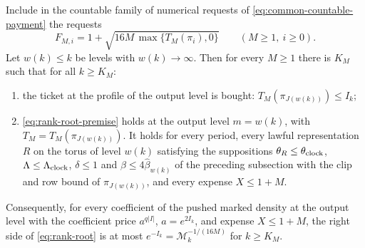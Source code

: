 \begin{proposition}
\label{prop:rank-root-output-ticket}
Include in the countable family of numerical requests of
\eqref{eq:common-countable-payment} the requests
\begin{equation}\label{eq:rank-root-ticket-requests}
 F_{M,i}=1+\sqrt{16M\,\max\{T_M(\pi_i),0\}}\qquad(M\ge1,\ i\ge0).
\end{equation}
Let $w(k)\le k$ be levels with $w(k)\to\infty$. Then for every
$M\ge1$ there is $K_M$ such that for all $k\ge K_M$:
\begin{enumerate}
\item the ticket at the profile of the output level is bought:
 $T_M(\pi_{J(w(k))})\le I_k$;
\item \eqref{eq:rank-root-premise} holds at the output level $m=w(k)$,
 with $T_M=T_M(\pi_{J(w(k))})$. It holds for every period, every
 lawful representation $R$ on the torus of level $w(k)$ satisfying the
 suppositions $\theta_R\le\theta_{\rm clock}$, $\Lambda\le\Lambda_{\rm clock}$,
 $\delta\le1$ and $\beta\le4\widehat\beta_{w(k)}$ of the preceding
 subsection with the clip and row bound of $\pi_{J(w(k))}$, and every
 expense $X\le1+M$.
\end{enumerate}
Consequently, for every coefficient of the pushed marked density at the
output level with the coefficient price $a^{q|I|}$, $a=e^{2I_k}$, and
expense $X\le1+M$, the right side of \eqref{eq:rank-root} is at most
$e^{-I_k}=\mathcal M_k^{-1/(16M)}$ for $k\ge K_M$.
\end{proposition}
